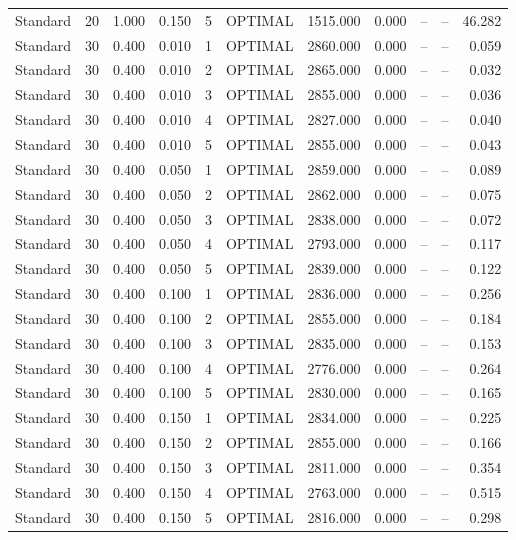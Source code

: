 \begin{table}
\begin{tabular}{lrrrrlrrrrr}
Standard & 20 & 1.000 & 0.150 & 5 & OPTIMAL & 1515.000 & 0.000 & -- & -- & 46.282 \\
Standard & 30 & 0.400 & 0.010 & 1 & OPTIMAL & 2860.000 & 0.000 & -- & -- & 0.059 \\
Standard & 30 & 0.400 & 0.010 & 2 & OPTIMAL & 2865.000 & 0.000 & -- & -- & 0.032 \\
Standard & 30 & 0.400 & 0.010 & 3 & OPTIMAL & 2855.000 & 0.000 & -- & -- & 0.036 \\
Standard & 30 & 0.400 & 0.010 & 4 & OPTIMAL & 2827.000 & 0.000 & -- & -- & 0.040 \\
Standard & 30 & 0.400 & 0.010 & 5 & OPTIMAL & 2855.000 & 0.000 & -- & -- & 0.043 \\
Standard & 30 & 0.400 & 0.050 & 1 & OPTIMAL & 2859.000 & 0.000 & -- & -- & 0.089 \\
Standard & 30 & 0.400 & 0.050 & 2 & OPTIMAL & 2862.000 & 0.000 & -- & -- & 0.075 \\
Standard & 30 & 0.400 & 0.050 & 3 & OPTIMAL & 2838.000 & 0.000 & -- & -- & 0.072 \\
Standard & 30 & 0.400 & 0.050 & 4 & OPTIMAL & 2793.000 & 0.000 & -- & -- & 0.117 \\
Standard & 30 & 0.400 & 0.050 & 5 & OPTIMAL & 2839.000 & 0.000 & -- & -- & 0.122 \\
Standard & 30 & 0.400 & 0.100 & 1 & OPTIMAL & 2836.000 & 0.000 & -- & -- & 0.256 \\
Standard & 30 & 0.400 & 0.100 & 2 & OPTIMAL & 2855.000 & 0.000 & -- & -- & 0.184 \\
Standard & 30 & 0.400 & 0.100 & 3 & OPTIMAL & 2835.000 & 0.000 & -- & -- & 0.153 \\
Standard & 30 & 0.400 & 0.100 & 4 & OPTIMAL & 2776.000 & 0.000 & -- & -- & 0.264 \\
Standard & 30 & 0.400 & 0.100 & 5 & OPTIMAL & 2830.000 & 0.000 & -- & -- & 0.165 \\
Standard & 30 & 0.400 & 0.150 & 1 & OPTIMAL & 2834.000 & 0.000 & -- & -- & 0.225 \\
Standard & 30 & 0.400 & 0.150 & 2 & OPTIMAL & 2855.000 & 0.000 & -- & -- & 0.166 \\
Standard & 30 & 0.400 & 0.150 & 3 & OPTIMAL & 2811.000 & 0.000 & -- & -- & 0.354 \\
Standard & 30 & 0.400 & 0.150 & 4 & OPTIMAL & 2763.000 & 0.000 & -- & -- & 0.515 \\
Standard & 30 & 0.400 & 0.150 & 5 & OPTIMAL & 2816.000 & 0.000 & -- & -- & 0.298 \\

\end{tabular}
\end{table}
